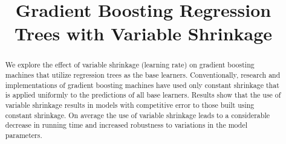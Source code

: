 \documentclass[9pt, conference]{IEEEtran}
\begin{document}
%
\title{Gradient Boosting Regression Trees with Variable Shrinkage}


\author{
\and
{}
}

\maketitle

\begin{abstract}
We explore the effect of variable shrinkage (learning rate) on gradient boosting machines that utilize regression trees as the base learners. Conventionally, research and implementations of gradient boosting machines have used only constant shrinkage that is applied uniformly to the predictions of all base learners. Results show that the use of variable shrinkage results in models with competitive error to those built using constant shrinkage. On average the use of variable shrinkage leads to a considerable decrease in running time and increased robustness to variations in the model parameters.
\end{abstract}





%
\IEEEpeerreviewmaketitle
\end{document}
